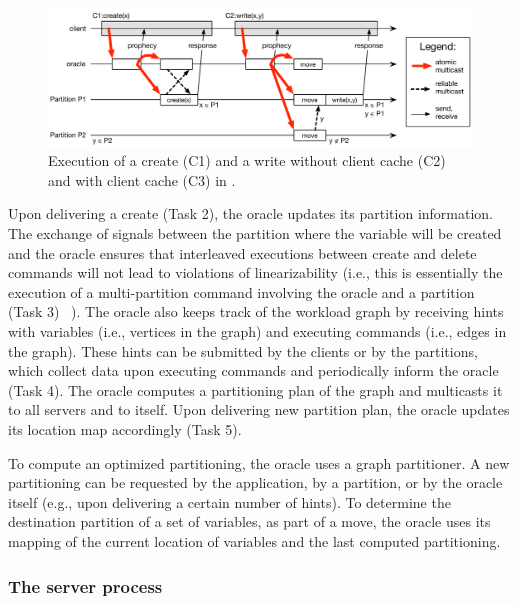 \begin{figure}[h!]
\begin{minipage}[b]{1\linewidth}
\centering
      \includegraphics[width=\linewidth]{figures/dynastar}
\end{minipage}
\caption{Execution of a create (C1) and a write without client cache (C2) and with client cache (C3) in \dynastar.}
\label{fig:oracle_repartition}
\end{figure}

Upon delivering a create (Task 2), the oracle updates its partition information.
The exchange of signals between the partition where the variable will be created
and the oracle ensures that interleaved executions between create and delete
commands will not lead to violations of linearizability (i.e., this is
essentially the execution of a multi-partition command involving the oracle and
a partition (Task 3) ~\cite{bezerra2014ssmr}). The oracle also keeps track of
the workload graph by receiving hints with variables (i.e., vertices in the
graph) and executing commands (i.e., edges in the graph). These hints can be
submitted by the clients or by the partitions, which collect data upon executing
commands and periodically inform the oracle (Task 4). The oracle computes a
partitioning plan of the graph and multicasts it to all servers and to itself.
Upon delivering new partition plan, the oracle updates its location map
accordingly (Task 5).

To compute an optimized partitioning, the oracle uses a graph partitioner. A new
partitioning can be requested by the application, by a partition, or by the
oracle itself (e.g., upon delivering a certain number of hints). To determine
the destination partition of a set of variables, as part of a move, the oracle
uses its mapping of the current location of variables and the last computed
partitioning.

\subsubsection{The server process}

